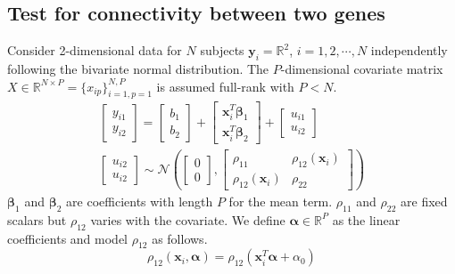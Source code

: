 \documentclass[aoas,preprint]{imsart}
\numberwithin{equation}{section}
\theoremstyle{plain}
\begin{document}
\subsection{Test for connectivity between two genes \label{sec:framework2}}
Consider 2-dimensional data for $N$ subjects $\bm{y}_i = \mathbb{R}^2$, $i = 1, 2, \cdots, N$ independently following the bivariate normal distribution. The $P$-dimensional covariate matrix $X \in \mathbb{R}^{N \times P} = \{x_{ip}\}_{i=1,p=1}^{N,P}$ is assumed full-rank with $P < N$.
\begin{equation}
\begin{multlined}
    \begin{bmatrix} y_{i1} \\ y_{i2} \end{bmatrix} = 
    \begin{bmatrix} b_{1} \\ b_{2} \end{bmatrix} + 
    \begin{bmatrix} \bm{x}_i^T \bm{\beta}_1 \\ \bm{x}_i^T \bm{\beta}_2 \end{bmatrix} + 
    \begin{bmatrix} {u_{i1}} \\ {u_{i2}} \end{bmatrix}\\
    \begin{bmatrix} {u_{i2}} \\ u_{i2} \end{bmatrix} 
    \sim \mathcal{N}\left(
        \begin{bmatrix} 0 \\ 0 \end{bmatrix}, 
        \begin{bmatrix} \rho_{11} & \rho_{12}(\bm{x}_i) \\ 
        \rho_{12}(\bm{x}_i) & \rho_{22} \end{bmatrix}
    \right)
    \end{multlined}
    \label{eq:framework_2genes}
\end{equation}
$\bm{\beta}_1$ and $\bm{\beta}_2$ are coefficients with length $P$  for the mean term. $\rho_{11}$ and $\rho_{22}$ are fixed scalars but $\rho_{12}$ varies with the covariate. We define $\bm{\alpha} \in \mathbb{R}^{P}$ as the linear coefficients and model $\rho_{12}$ as follows.
\begin{equation}
    \rho_{12}(\bm{x}_i, \bm{\alpha}) = \rho_{12}(\bm{x}_i^T\bm{\alpha} + \alpha_0) \label{eq:rho}
\end{equation}
\end{document}

